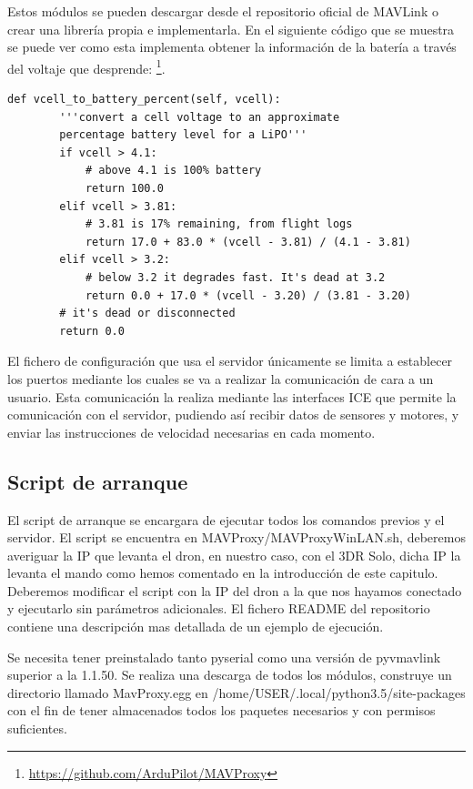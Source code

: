 Estos módulos se pueden descargar desde el repositorio oficial de MAVLink o crear una librería propia e implementarla. En el siguiente código que se muestra se puede ver como esta implementa obtener la información de la batería a través del voltaje que desprende:
\footnote{\url{https://github.com/ArduPilot/MAVProxy}}.

\begin{lstlisting}[frame=single]
    def vcell_to_battery_percent(self, vcell):
        '''convert a cell voltage to an approximate
        percentage battery level for a LiPO'''
        if vcell > 4.1:
            # above 4.1 is 100% battery
            return 100.0
        elif vcell > 3.81:
            # 3.81 is 17% remaining, from flight logs
            return 17.0 + 83.0 * (vcell - 3.81) / (4.1 - 3.81)
        elif vcell > 3.2:
            # below 3.2 it degrades fast. It's dead at 3.2
            return 0.0 + 17.0 * (vcell - 3.20) / (3.81 - 3.20)
        # it's dead or disconnected
        return 0.0
\end{lstlisting}

El fichero de configuración que usa el servidor únicamente se limita a establecer los puertos mediante los cuales se va a realizar la comunicación de cara a un usuario. Esta comunicación la realiza mediante las interfaces ICE que permite la comunicación con el servidor, pudiendo así recibir datos de sensores y motores, y enviar las instrucciones de velocidad necesarias en cada momento.


\subsection{Script de arranque}
\label{Script de arranque}

El script de arranque se encargara de ejecutar todos los comandos previos y el servidor. El script se encuentra en MAVProxy/MAVProxyWinLAN.sh, deberemos averiguar la IP que levanta el dron, en nuestro caso, con el 3DR Solo, dicha IP la levanta el mando como hemos comentado en la introducción de este capitulo. Deberemos modificar el script con la IP del dron a la que nos hayamos conectado y ejecutarlo sin parámetros adicionales. El fichero README del repositorio contiene una descripción mas detallada de un ejemplo de ejecución.

Se necesita tener preinstalado tanto pyserial como una versión de pyvmavlink superior a la 1.1.50. Se realiza una descarga de todos los módulos, construye un directorio llamado MavProxy.egg en /home/USER/.local/python3.5/site-packages con el fin de tener almacenados todos los paquetes necesarios y con permisos suficientes. 

